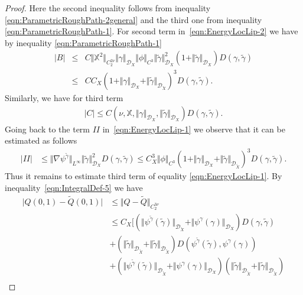 \documentclass[11pt,a4paper,reqno]{amsart}%
\theoremstyle{plain}
\theoremstyle{remark}
\theoremstyle{plain}
\numberwithin{equation}{section}
\begin{document}
\begin{proof}
Here the second inequality follows from inequality
\eqref{eqn:ParametricRoughPath-2general} and the third one from
inequality \eqref{eqn:ParametricRoughPath-1}. For second term in~\eqref{eqn:EnergyLocLip-2} we
have by inequality \eqref{eqn:ParametricRoughPath-1}
\begin{eqnarray}
\vert B\vert &\leq&
C\Vert \mathbb{X}^2\Vert_{C_2^{2\nu}}\Vert \gamma\Vert_{\mathcal{D}_X}\Vert \phi\Vert_{C^3}\Vert \tilde{\gamma}\Vert_{\mathcal{D}_X}^2
(1+\Vert \tilde{\gamma}\Vert_{\mathcal{D}_X})D( \gamma,\tilde{\gamma})\nonumber
\\
&\leq& CC_X(1+\Vert \gamma\Vert_{\mathcal{D}_X}+\Vert \tilde{\gamma}\Vert_{\mathcal{D}_{\tilde{X}}})^3 D( \gamma,\tilde{\gamma}).
\label{eqn:EnergyLocLip-4}
\end{eqnarray}
Similarly, we have for third term
\begin{eqnarray}
\vert C\vert \leq
C(\nu,\mathbb{X},\Vert \gamma\Vert_{\mathcal{D}_X},\Vert \tilde{\gamma}\Vert_{\mathcal{D}_X})D( \gamma,\tilde{\gamma}).\label{eqn:EnergyLocLip-5}
\end{eqnarray}
Going back to the term $II$ in~\eqref{eqn:EnergyLocLip-1} we observe that it can be estimated as
follows
\begin{align*}
\vert II\vert &\leq
\Vert \nabla\psi^{\tilde{\gamma}}\Vert_{L^{\infty}}\Vert \tilde{\gamma}\Vert_{\mathcal{D}_X}^2D( \gamma,\tilde{\gamma})
\leq
C_X^3\Vert \phi\Vert_{C^3}(1+\Vert \gamma\Vert_{\mathcal{D}_X}+\Vert \tilde{\gamma}\Vert_{\mathcal{D}_{\tilde{X}}})^3D( \gamma,\tilde{\gamma}).
\end{align*}
Thus it remains to estimate third term of equality
\eqref{eqn:EnergyLocLip-1}. By inequality~\eqref{eqn:IntegralDef-5} we have
\begin{align*}
\vert Q(0,1)-\tilde{Q}(0,1)\vert &\leq \Vert Q-\tilde{Q}\Vert_{C_2^{3\nu}}\\
&\leq
C_X\Big[(\Vert \psi^{\tilde{\gamma}}(\tilde{\gamma})\Vert_{\mathcal{D}_{\tilde{X}}}+
\Vert \psi^{\gamma}(\gamma)\Vert_{\mathcal{D}_X})D( \gamma,\tilde{\gamma})\\
&+(\Vert \tilde{\gamma}\Vert_{\mathcal{D}_{\tilde{X}}}+\Vert \tilde{\gamma}\Vert_{\mathcal{D}_{\tilde{X}}})D( \psi^{\tilde{\gamma}}(\tilde{\gamma}), \psi^{\gamma}(\gamma))\\
&+(\Vert \psi^{\tilde{\gamma}}(\tilde{\gamma})\Vert_{\mathcal{D}_{\tilde{X}}}+
\Vert \psi^{\gamma}(\gamma)\Vert_{\mathcal{D}_X})(\Vert \tilde{\gamma}\Vert_{\mathcal{D}_{\tilde{X}}}+\Vert \tilde{\gamma}\Vert_{\mathcal{D}_{\tilde{X}}})\\

\end{align*}
\end{proof}
\end{document}
